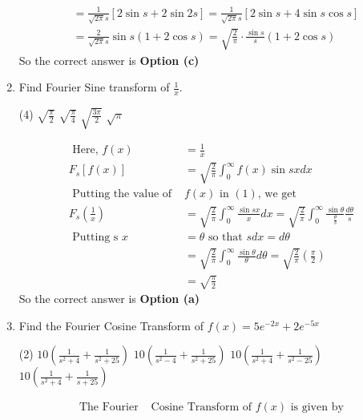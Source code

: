 \begin{enumerate}
\begin{answer}
$$\begin{aligned}
	&=\frac{1}{\sqrt{2 \pi }s}[2 \sin s+2 \sin 2 s]=\frac{1}{\sqrt{2 \pi }s}[2 \sin s+4 \sin s \cos s] \\
	&=\frac{2}{\sqrt{2 \pi }s} \sin s(1+2 \cos s)=\sqrt{\frac{2}{\pi}} \cdot \frac{\sin s}{s}(1+2 \cos s)
\end{aligned}
$$
	So the correct answer is \textbf{Option (c)}
\end{answer}
\item Find Fourier Sine transform of $\frac{1}{x}$.
\begin{tasks}(4)
	\task[\textbf{a.}]$\sqrt{\frac{\pi}{2}}$
	\task[\textbf{b.}]$\sqrt{\frac{\pi}{4}}$
	\task[\textbf{c.}]$\sqrt{\frac{3\pi}{2}}$
	\task[\textbf{d.}] $\sqrt{\pi}$
\end{tasks}
\begin{answer}
	$$
	\begin{aligned}
	\text { Here, } f(x)&=\frac{1}{x}\\
	F_{s}[f(x)]&=\sqrt{\frac{2}{\pi}} \int_{0}^{\infty} f(x) \sin s x d x\\
	\text { Putting the value of }& f(x) \text { in }(1) \text {, we get }\\
	F_{s}\left(\frac{1}{x}\right)&=\sqrt{\frac{2}{\pi}} \int_{0}^{\infty} \frac{\sin s x}{x} d x=\sqrt{\frac{2}{\pi}} \int_{0}^{\infty} \frac{\sin \theta}{\frac{\theta}{s}} \frac{d \theta}{s}\\
	\text { Putting s } x&=\theta \text { so that } s d x=d \theta\\
	&=\sqrt{\frac{2}{\pi}} \int_{0}^{\infty} \frac{\sin \theta}{\theta} d \theta=\sqrt{\frac{2}{\pi}}\left(\frac{\pi}{2}\right)\\
	&=\sqrt{\frac{\pi}{2}}
\end{aligned}
$$
	So the correct answer is \textbf{Option (a)}
\end{answer}
\item Find the Fourier Cosine Transform of $f(x)=5 e^{-2 x}+2 e^{-5 x}$
\begin{tasks}(2)
	\task[\textbf{a.}]$10\left(\frac{1}{s^{2}+4}+\frac{1}{s^{2}+25}\right)$
	\task[\textbf{b.}]$10\left(\frac{1}{s^{2}-4}+\frac{1}{s^{2}+25}\right)$
	\task[\textbf{c.}]$10\left(\frac{1}{s^{2}+4}+\frac{1}{s^{2}-25}\right)$
	\task[\textbf{d.}] $10\left(\frac{1}{s^{2}+4}+\frac{1}{s+25}\right)$
\end{tasks}
\begin{answer}
	$$
	\begin{aligned}
	\text { The Fourier } &\text{Cosine Transform of }f(x) \text { is given by }\\

\end{aligned}$$
\end{answer}
\end{enumerate}

